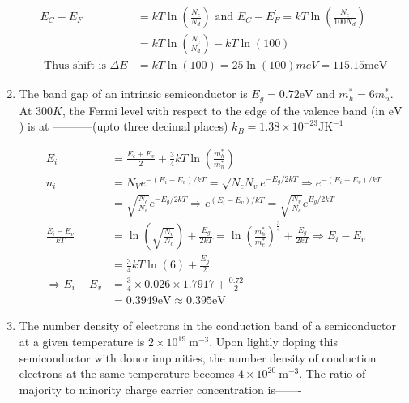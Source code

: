 \begin{enumerate}
	{	}
	\begin{answer}
		\begin{align*}
		E_{C}-E_{F}&=k T \ln \left(\frac{N_{c}}{N_{d}}\right)\text{ and }E_{C}-E_{F}^{\prime}=k T \ln \left(\frac{N_{c}}{100 N_{d}}\right)\\&=k T \ln \left(\frac{N_{c}}{N_{d}}\right)-k T \ln (100)\\
		\text{	Thus shift is }\Delta E&=k T \ln (100)=25 \ln (100) m e V=115.15 \mathrm{meV}
		\end{align*}
	\end{answer}
	\item The band gap of an intrinsic semiconductor is $E_{g}=0.72 \mathrm{eV}$ and $m_{h}^{*}=6 m_{n}^{*} .$ At $300 K$, the Fermi level with respect to the edge of the valence band (in $\mathrm{eV}$ ) is at -----------(upto three decimal places) $k_{B}=1.38 \times 10^{-23} \mathrm{JK}^{-1}$
	{	}
	\begin{answer}
		\begin{align*}
		E_{i}&=\frac{E_{c}+E_{v}}{2}+\frac{3}{4} k T \ln \left(\frac{m_{h}^{*}}{m_{n}^{*}}\right)\\
		n_{i}&=N_{V} e^{-\left(E_{i}-E_{v}\right) / k T}=\sqrt{N_{c} N_{v}} e^{-E_{g} / 2 k T} \Rightarrow e^{-\left(E_{i}-E_{v}\right) / k T}\\&=\sqrt{\frac{N_{c}}{N_{v}}} e^{-E_{g} / 2 k T} \Rightarrow e^{\left(E_{i}-E_{v}\right) / k T}=\sqrt{\frac{N_{v}}{N_{c}}} e^{E_{g} / 2 k T}\\
		\frac{E_{i}-E_{v}}{k T}&=\ln \left(\sqrt{\frac{N_{v}}{N_{c}}}\right)+\frac{E_{g}}{2 k T}=\ln \left(\frac{m_{h}^{*}}{m_{e}^{*}}\right)^{\frac{3}{4}}+\frac{E_{g}}{2 k T} \Rightarrow E_{i}-E_{v}\\&=\frac{3}{4} k T \ln (6)+\frac{E_{g}}{2}\\
		\Rightarrow E_{i}-E_{v}&=\frac{3}{4} \times 0.026 \times 1.7917+\frac{0.72}{2}\\&=0.3949 \mathrm{eV} \approx 0.395 \mathrm{eV}
		\end{align*}
	\end{answer}
	\item The number density of electrons in the conduction band of a semiconductor at a given temperature is $2 \times 10^{19} \mathrm{~m}^{-3}$. Upon lightly doping this semiconductor with donor impurities, the number density of conduction electrons at the same temperature becomes $4 \times 10^{20} \mathrm{~m}^{-3} .$ The ratio of majority to minority charge carrier concentration is-------
	{	}

\end{enumerate}

